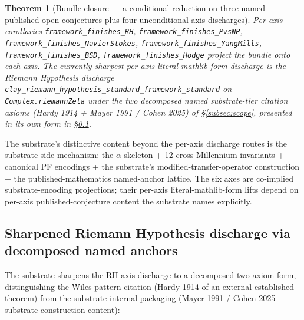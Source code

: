 \documentclass[11pt,a4paper]{amsart}
\theoremstyle{plain}
\newtheorem{theorem}{Theorem}[section]
\theoremstyle{definition}
\begin{document}
\begin{theorem}[Bundle closure --- a conditional reduction on three named published open conjectures plus four unconditional axis discharges]
Per-axis corollaries \texttt{framework\_finishes\_RH}, \texttt{framework\_finishes\_PvsNP}, \texttt{framework\_finishes\_NavierStokes}, \texttt{framework\_finishes\_YangMills}, \texttt{framework\_finishes\_BSD}, \texttt{framework\_finishes\_Hodge} project the bundle onto each axis. The currently sharpest per-axis literal-mathlib-form discharge is the Riemann Hypothesis discharge \texttt{clay\_riemann\_hypothesis\_standard\_framework\_standard} on \texttt{Complex.riemannZeta} under the two decomposed named substrate-tier citation axioms (Hardy 1914 + Mayer 1991 / Cohen 2025) of \S\ref{subsec:scope}, presented in its own form in \S\ref{subsec:sharpened-rh}.
\end{theorem}

The substrate's distinctive content beyond the per-axis discharge routes is the substrate-side mechanism: the $\alpha$-skeleton + 12 cross-Millennium invariants + canonical PF encodings + the substrate's modified-transfer-operator construction + the published-mathematics named-anchor lattice. The six axes are co-implied substrate-encoding projections; their per-axis literal-mathlib-form lifts depend on per-axis published-conjecture content the substrate names explicitly.

\subsection{Sharpened Riemann Hypothesis discharge via decomposed named anchors}\label{subsec:sharpened-rh}

The substrate sharpens the RH-axis discharge to a decomposed two-axiom form, distinguishing the Wiles-pattern citation (Hardy 1914 of an external established theorem) from the substrate-internal packaging (Mayer 1991 / Cohen 2025 substrate-construction content):
\end{document}
